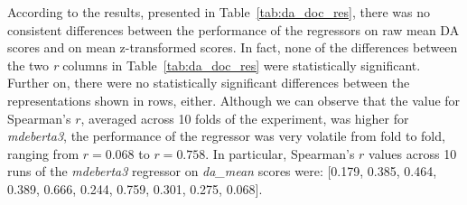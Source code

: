 According to the results, presented in Table~\ref{tab:da_doc_res}, there was no consistent differences between the performance of the regressors on raw mean DA scores and on mean z-transformed scores. In fact, none of the differences between the two \textit{r} columns in Table~\ref{tab:da_doc_res} were statistically significant.
Further on, there were no statistically significant differences between the representations shown in rows, either. Although we can observe that the value for Spearman's $r$, averaged across 10 folds of the experiment, was higher for \textit{mdeberta3}, the performance of the regressor was very volatile from fold to fold, ranging from $r=0.068$ to $r=0.758$. In particular, Spearman's $r$ values across 10 runs of the \textit{mdeberta3} regressor on \textit{da\_mean} scores were: [0.179, 0.385, 0.464, 0.389, 0.666, 0.244, 0.759, 0.301, 0.275, 0.068].

